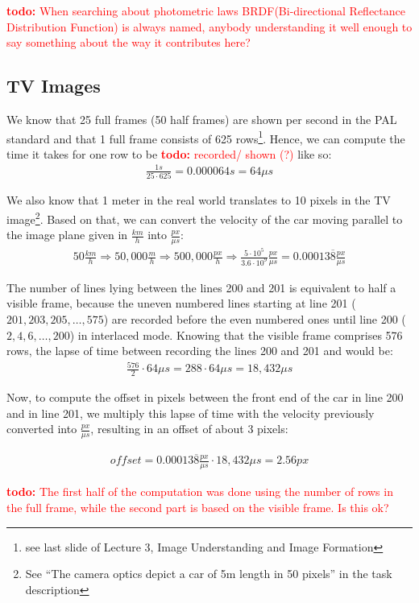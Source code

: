 \documentclass[a4paper,12pt]{article}
\newcommand{\twodo}[1]{\textcolor{red}{\textbf{todo:} #1}}
\begin{document}
	\twodo{When searching about photometric laws BRDF(Bi-directional Reflectance Distribution Function) is always named, anybody understanding it well enough to say something about the way it contributes here? }
		
	\subsection{TV Images}
	We know that 25 full frames (50 half frames) are shown per second in the PAL standard and that 1 full frame consists of 625 rows\footnote{see last slide of Lecture 3, Image Understanding and Image Formation}. Hence, we can compute the time it takes for one row to be \twodo{recorded/ shown (?)} like so:
	\begin{align*}
		\frac{1 s}{25 \cdot 625} = 0.000064 s = 64\mu s
	\end{align*}
	
	We also know that 1 meter in the real world translates to 10 pixels in the TV image\footnote{See ``The camera optics depict a car of 5m length in 50 pixels'' in the task description}. Based on that, we can convert the velocity of the car moving parallel to the image plane given in $\frac{km}{h}$ into $\frac{px}{\mu s}$:
	\begin{align*}
		50 \frac{km}{h} \Rightarrow 50,000 \frac{m}{h} \Rightarrow 500,000 \frac{px}{h} \Rightarrow \frac{5 \cdot 10^{5}}{3.6 \cdot 10^{9}} \frac{px}{\mu s} = 0.00013\overline{8} \frac{px}{\mu s}
	\end{align*}
	
	The number of lines lying between the lines 200 and 201 is equivalent to half a visible frame, because the uneven numbered lines starting at line 201 ($201, 203, 205, \dots, 575$) are recorded before the even numbered ones until line 200 ($2, 4, 6, \dots, 200$) in interlaced mode. Knowing that the visible frame comprises 576 rows, the lapse of time between recording the lines 200 and 201 and would be:
	\begin{align*}
	\frac{576}{2} \cdot 64\mu s = 288 \cdot 64\mu s = 18,432 \mu s
	\end{align*}
	
	Now, to compute the offset in pixels between the front end of the car in line 200 and in line 201, we multiply this lapse of time with the velocity previously converted into $\frac{px}{\mu s}$, resulting in an offset of about 3 pixels:
	
	\begin{align*}
	offset = 0.00013\overline{8} \frac{px}{\mu s} \cdot 18,432 \mu s = 2.56 px
	\end{align*}
	
	\twodo{The first half of the computation was done using the number of rows in the full frame, while the second part is based on the visible frame. Is this ok?}
	
\end{document}
